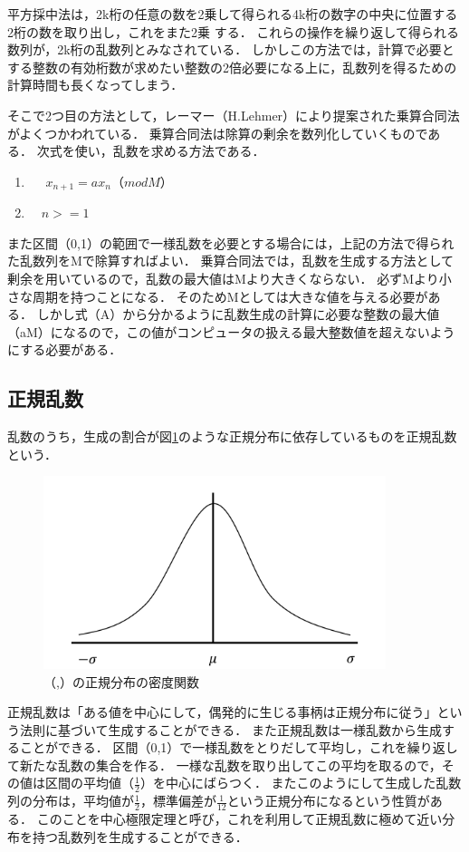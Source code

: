 \documentclass[12pt,a4j]{ltjsarticle}
\begin{document}
平方採中法は，2k桁の任意の数を2乗して得られる4k桁の数字の中央に位置する2桁の数を取り出し，これをまた2乗
する．
これらの操作を繰り返して得られる数列が，2k桁の乱数列とみなされている．
しかしこの方法では，計算で必要とする整数の有効桁数が求めたい整数の2倍必要になる上に，乱数列を得るための計算時間も長くなってしまう．

そこで2つ目の方法として，レーマー（H.Lehmer）により提案された乗算合同法がよくつかわれている．
乗算合同法は除算の剰余を数列化していくものである．
次式を使い，乱数を求める方法である．
\begin{enumerate}[label=(\Alph*)]
	\item　 $x_{n+1} = ax_n（mod M）$
	\item　$n >= 1$
\end{enumerate} 

また区間（0,1）の範囲で一様乱数を必要とする場合には，上記の方法で得られた乱数列をMで除算すればよい．
乗算合同法では，乱数を生成する方法として剰余を用いているので，乱数の最大値はMより大きくならない．
必ずMより小さな周期を持つことになる．
そのためMとしては大きな値を与える必要がある．
しかし式（A）から分かるように乱数生成の計算に必要な整数の最大値（aM）になるので，この値がコンピュータの扱える最大整数値を超えないようにする必要がある．

\clearpage

\subsection{正規乱数}
乱数のうち，生成の割合が図\ref{fig:seikiransuu}のような正規分布に依存しているものを正規乱数という．
\begin{figure}[h]
\begin{center}
\includegraphics[width = 100mm ] {figures/seikiransuu.pdf}
\caption{（\mu,\sigma）の正規分布の密度関数}
\end{center}
\label{fig:seikiransuu}
\end{figure}

正規乱数は「ある値を中心にして，偶発的に生じる事柄は正規分布に従う」という法則に基づいて生成することができる．
また正規乱数は一様乱数から生成することができる．
区間（0,1）で一様乱数をとりだして平均し，これを繰り返して新たな乱数の集合を作る．
一様な乱数を取り出してこの平均を取るので，その値は区間の平均値（$\frac{1}{2}$）を中心にばらつく．
またこのようにして生成した乱数列の分布は，平均値が$\frac{1}{2}$，標準偏差が$\frac{1}{12}$という正規分布になるという性質がある．
このことを中心極限定理と呼び，これを利用して正規乱数に極めて近い分布を持つ乱数列を生成することができる．
\end{document}
